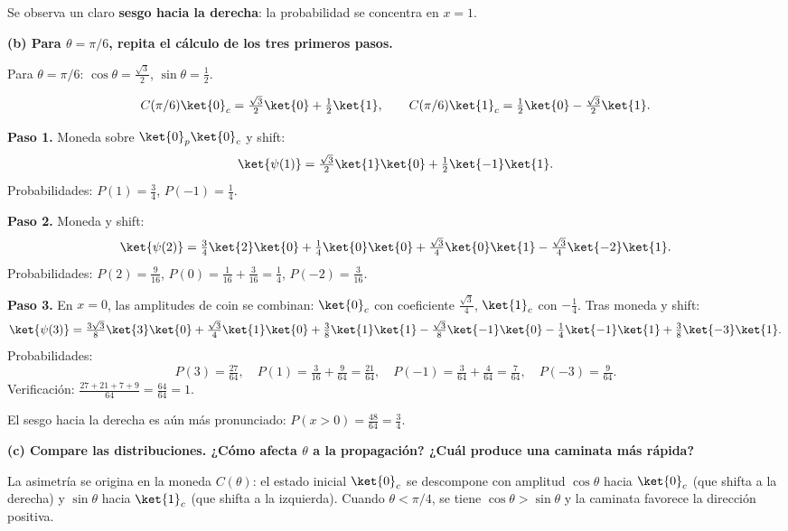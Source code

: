 Se observa un claro \textbf{sesgo hacia la derecha}: la probabilidad se concentra en $x=1$.

\vspace{0.5cm}

{\bfseries (b) Para $\theta = \pi/6$, repita el cálculo de los tres primeros pasos.}

Para $\theta = \pi/6$: $\cos\theta = \tfrac{\sqrt{3}}{2}$, $\sin\theta = \tfrac{1}{2}$.

$$
    C(\pi/6)\ket{0}_c = \tfrac{\sqrt{3}}{2}\ket{0} + \tfrac{1}{2}\ket{1}, \qquad C(\pi/6)\ket{1}_c = \tfrac{1}{2}\ket{0} - \tfrac{\sqrt{3}}{2}\ket{1}.
$$

\textbf{Paso 1.} Moneda sobre $\ket{0}_p\ket{0}_c$ y shift:
$$
    \ket{\psi(1)} = \tfrac{\sqrt{3}}{2}\ket{1}\ket{0} + \tfrac{1}{2}\ket{-1}\ket{1}.
$$
Probabilidades: $P(1) = \tfrac{3}{4}$, $P(-1) = \tfrac{1}{4}$.

\textbf{Paso 2.} Moneda y shift:
$$
    \ket{\psi(2)} = \tfrac{3}{4}\ket{2}\ket{0} + \tfrac{1}{4}\ket{0}\ket{0} + \tfrac{\sqrt{3}}{4}\ket{0}\ket{1} - \tfrac{\sqrt{3}}{4}\ket{-2}\ket{1}.
$$
Probabilidades: $P(2) = \tfrac{9}{16}$, $P(0) = \tfrac{1}{16}+\tfrac{3}{16} = \tfrac{1}{4}$, $P(-2) = \tfrac{3}{16}$.

\textbf{Paso 3.} En $x=0$, las amplitudes de coin se combinan: $\ket{0}_c$ con coeficiente $\tfrac{\sqrt{3}}{4}$, $\ket{1}_c$ con $-\tfrac{1}{4}$. Tras moneda y shift:
$$
    \ket{\psi(3)} = \tfrac{3\sqrt{3}}{8}\ket{3}\ket{0} + \tfrac{\sqrt{3}}{4}\ket{1}\ket{0} + \tfrac{3}{8}\ket{1}\ket{1} - \tfrac{\sqrt{3}}{8}\ket{-1}\ket{0} - \tfrac{1}{4}\ket{-1}\ket{1} + \tfrac{3}{8}\ket{-3}\ket{1}.
$$
Probabilidades:
$$
    P(3)=\tfrac{27}{64}, \quad P(1)=\tfrac{3}{16}+\tfrac{9}{64}=\tfrac{21}{64}, \quad P(-1)=\tfrac{3}{64}+\tfrac{4}{64}=\tfrac{7}{64}, \quad P(-3)=\tfrac{9}{64}.
$$
Verificación: $\tfrac{27+21+7+9}{64} = \tfrac{64}{64} = 1$.

El sesgo hacia la derecha es aún más pronunciado: $P(x>0) = \tfrac{48}{64} = \tfrac{3}{4}$.

\vspace{0.5cm}

{\bfseries (c) Compare las distribuciones. ¿Cómo afecta $\theta$ a la propagación? ¿Cuál produce una caminata más rápida?}

La asimetría se origina en la moneda $C(\theta)$: el estado inicial $\ket{0}_c$ se descompone con amplitud $\cos\theta$ hacia $\ket{0}_c$ (que shifta a la derecha) y $\sin\theta$ hacia $\ket{1}_c$ (que shifta a la izquierda). Cuando $\theta < \pi/4$, se tiene $\cos\theta > \sin\theta$ y la caminata favorece la dirección positiva.

